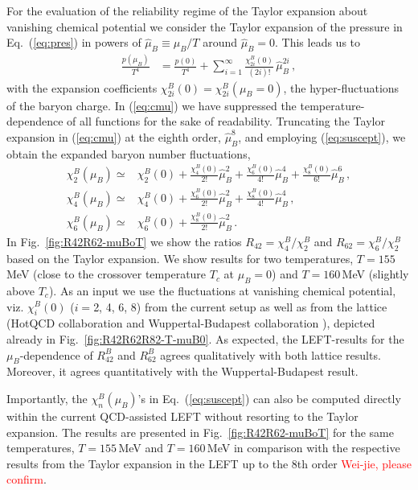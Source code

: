 \documentclass[%
reprint,
superscriptaddress,
showpacs,preprintnumbers,
amsmath,amssymb,
aps,
prd,
]{revtex4-1}
\def\Fig#1{Fig.~\ref{#1}} \def\Tab#1{Tab.~\ref{#1}}
\def\Eq#1{Eq.~(\ref{#1})}
\def\eq#1{(\ref{#1})}
\newcommand{\coljan}[1]{\textcolor{red}{#1}}
\begin{document}
For the evaluation of the reliability regime of the Taylor expansion about vanishing chemical potential we consider the Taylor expansion of the pressure in \Eq{eq:pres} in powers of $\hat{\mu}_{B}\equiv\mu_B/T$ around $\hat{\mu}_{B}=0$. This leads us to 
%
\begin{align}
\frac{p(\mu_B)}{T^4}&=\frac{p(0)}{T^4}+\sum_{i=1}^{\infty}\frac{\chi^B_{2i}(0)}{(2i)!}\,\hat{\mu}_{B}^{2i}\,,\label{eq:cmu}
\end{align}
%
with the expansion coefficients $\chi^B_{2i}(0)=\chi^B_{2i}(\mu_B=0)$, the hyper-fluctuations of the baryon charge. In \eq{eq:cmu} we have suppressed the temperature-dependence of all functions for the sake of readability. Truncating the Taylor expansion in \eq{eq:cmu} at the eighth order, $\hat{\mu}_{B}^{8}$, and employing \eq{eq:suscept}, we obtain the expanded baryon number fluctuations, 
%
\begin{align}
\chi^B_2(\mu_B)\simeq&\chi^B_2(0)+\frac{\chi^B_4(0)}{2!}\hat{\mu}_{B}^{2}+\frac{\chi^B_6(0)}{4!}\hat{\mu}_{B}^{4}+\frac{\chi^B_8(0)}{6!}\hat{\mu}_{B}^{6}\,,\nonumber \\[2ex]
\chi^B_4(\mu_B)\simeq&\chi^B_4(0)+\frac{\chi^B_6(0)}{2!}\hat{\mu}_{B}^{2}+\frac{\chi^B_8(0)}{4!}\hat{\mu}_{B}^{4}\,,\nonumber\\[2ex]
\chi^B_6(\mu_B)\simeq&\chi^B_6(0)+\frac{\chi^B_8(0)}{2!}\hat{\mu}_{B}^{2}\,.\label{eq:chiBnTay}
\end{align}
%
In \Fig{fig:R42R62-muBoT} we show the ratios $R_{42}=\chi^B_4/\chi^B_2$ and $R_{62}=\chi^B_6/\chi^B_2$ based on the Taylor expansion. We show results for two temperatures,  $T=155$\,MeV (close to the crossover temperature $T_c$ at $\mu_B=0$) and $T=160$\,MeV (slightly above $T_c$). As an input we use the fluctuations at vanishing chemical potential, viz. $\chi^B_{i}(0)$ ($i=$2, 4, 6, 8) from the current setup as well as from the lattice (HotQCD collaboration \cite{Bazavov:2020bjn} and Wuppertal-Budapest collaboration \cite{Borsanyi:2018grb}), depicted already in \Fig{fig:R42R62R82-T-muB0}. As expected, the LEFT-results for the $\mu_B$-dependence of $R^{B}_{42}$ and $R^{B}_{62}$ agrees qualitatively with both lattice results. Moreover, it agrees quantitatively with the Wuppertal-Budapest result.   

Importantly, the $\chi^B_n(\mu_B)$'s in \Eq{eq:suscept} can  also be computed directly within the current QCD-assisted LEFT without resorting to the Taylor expansion. The results are presented in \Fig{fig:R42R62-muBoT} for the same temperatures, 
$T=155$\,MeV and $T=160$\,MeV in comparison with the respective results from the Taylor expansion in the LEFT up to the 8th order \coljan{Wei-jie, please confirm}.  
\end{document}
